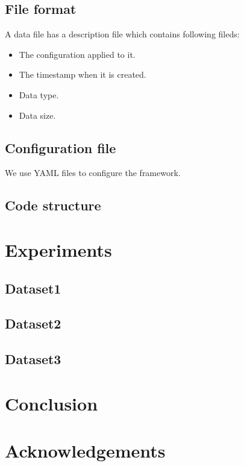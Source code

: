 \documentclass{article}
\begin{document}
    \subsection{File format}
    A data file has a description file which contains following fileds:

    \begin{itemize}
        \item The configuration applied to it.
        \item The timestamp when it is created.
        \item Data type.
        \item Data size.
    \end{itemize}

    \subsection{Configuration file}
    We use YAML files to configure the framework.

    \subsection{Code structure}


\section{Experiments}
    \subsection{Dataset1}
    \subsection{Dataset2}
    \subsection{Dataset3}

\section{Conclusion}


\section*{Acknowledgements}
\end{document}

